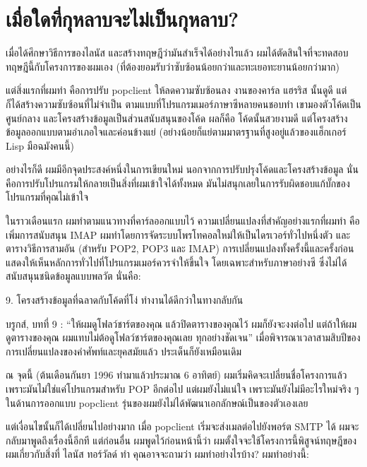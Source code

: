 \chapter{เมื่อใดที่กุหลาบจะไม่เป็นกุหลาบ?}

เมื่อได้ศึกษาวิธีการของไลนัส และสร้างทฤษฎีว่ามันสำเร็จได้อย่างไรแล้ว
ผมได้ตัดสินใจที่จะทดสอบทฤษฎีนี้กับโครงการของผมเอง
(ที่ต้องยอมรับว่าซับซ้อนน้อยกว่าและทะเยอทะยานน้อยกว่ามาก)

แต่สิ่งแรกที่ผมทำ คือการปรับ popclient ให้ลดความซับซ้อนลง งานของคาร์ล
แฮรริส นั้นดูดี แต่ก็ได้สร้างความซับซ้อนที่ไม่จำเป็น
ตามแบบที่โปรแกรมเมอร์ภาษาซีหลายคนชอบทำ เขามองตัวโค้ดเป็นศูนย์กลาง
และโครงสร้างข้อมูลเป็นส่วนสนับสนุนของโค้ด ผลก็คือ โค้ดนั้นสวยงามดี
แต่โครงสร้างข้อมูลออกแบบตามอำเภอใจและค่อนข้างแย่
(อย่างน้อยก็แย่ตามมาตรฐานที่สูงอยู่แล้วของแฮ็กเกอร์ Lisp มือฉมังคนนี้)

อย่างไรก็ดี ผมมีอีกจุดประสงค์หนึ่งในการเขียนใหม่
นอกจากการปรับปรุงโค้ดและโครงสร้างข้อมูล
นั่นคือการปรับโปรแกรมให้กลายเป็นสิ่งที่ผมเข้าใจได้ทั้งหมด
มันไม่สนุกเลยในการรับผิดชอบแก้บั๊กของโปรแกรมที่คุณไม่เข้าใจ

ในราวเดือนแรก ผมทำตามแนวทางที่คาร์ลออกแบบไว้
ความเปลี่ยนแปลงที่สำคัญอย่างแรกที่ผมทำ คือเพิ่มการสนับสนุน IMAP
ผมทำโดยการจัดระบบโพรโทคอลใหม่ให้เป็นไดรเวอร์ทั่วไปหนึ่งตัว
และตารางวิธีการสามอัน (สำหรับ POP2, POP3 และ IMAP)
การเปลี่ยนแปลงทั้งครั้งนี้และครั้งก่อน
แสดงให้เห็นหลักการทั่วไปที่โปรแกรมเมอร์ควรจำให้ขึ้นใจ
โดยเฉพาะสำหรับภาษาอย่างซี ซึ่งไม่ได้สนับสนุนชนิดข้อมูลแบบพลวัต นั่นคือ:

\begin{fancyquotes}
  9. โครงสร้างข้อมูลที่ฉลาดกับโค้ดที่โง่ ทำงานได้ดีกว่าในทางกลับกัน
\end{fancyquotes}

บรูกส์, บทที่ 9 : ``ให้ผมดูโฟลว์ชาร์ตของคุณ แล้วปิดตารางของคุณไว้
ผมก็ยังจะงงต่อไป แต่ถ้าให้ผมดูตารางของคุณ
ผมแทบไม่ต้อดูโฟลว์ชาร์ตของคุณเลย ทุกอย่างชัดเจน''
เมื่อพิจารณาเวลาสามสิบปีของการเปลี่ยนแปลงของคำศัพท์และยุคสมัยแล้ว
ประเด็นก็ยังเหมือนเดิม

ณ จุดนี้ (ต้นเดือนกันยา 1996 ทำมาแล้วประมาณ 6 อาทิตย์)
ผมเริ่มคิดจะเปลี่ยนชื่อโครงการแล้ว เพราะมันไม่ใช่แค่โปรแกรมสำหรับ POP
อีกต่อไป แต่ผมยังไม่แน่ใจ เพราะมันยังไม่มีอะไรใหม่จริง ๆ  ในด้านการออกแบบ
popclient รุ่นของผมยังไม่ได้พัฒนาเอกลักษณ์เป็นของตัวเองเลย

แต่เงื่อนไขนั้นก็ได้เปลี่ยนไปอย่างมาก เมื่อ popclient
เริ่มจะส่งเมลต่อไปยังพอร์ต SMTP ได้ ผมจะกลับมาพูดถึงเรื่องนี้อีกที
แต่ก่อนอื่น ผมพูดไว้ก่อนหน้านี้ว่า
ผมตั้งใจจะใช้โครงการนี้พิสูจน์ทฤษฎีของผมเกี่ยวกับสิ่งที่ ไลนัส ทอร์วัลด์
ทำ คุณอาจจะถามว่า ผมทำอย่างไรบ้าง? ผมทำอย่างนี้:

